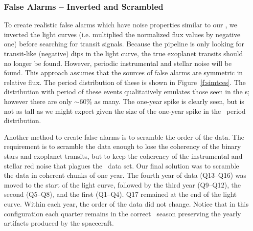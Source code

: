 \subsubsection{False Alarms -- Inverted and Scrambled} 

To create realistic false alarms which have noise properties similar to our , we inverted the light curves (i.e. multiplied the normalized flux values by negative one) before searching for transit signals. Because the pipeline is only looking for transit-like (negative) dips in the light curve, the true exoplanet transits should no longer be found. However, periodic instrumental and stellar noise will be found. This approach assumes that the sources of false alarms are symmetric in relative flux. The period distribution of these  is shown in Figure~\ref{f:simtces}. The distribution with period of these events qualitatively emulates those seen in the \opstce s; however there are only $\sim$60\% as many. The one-year spike is clearly seen, but is not as tall as we might expect given the size of the one-year spike in the \opstce\ period distribution. 

Another method to create false alarms is to scramble the order of the data. The requirement is to scramble the data enough to lose the coherency of the binary stars and exoplanet transits, but to keep the coherency of the instrumental and stellar red noise that plagues the \Kepler\ data set. Our final solution was to scramble the data in coherent chunks of one year. The fourth year of data (Q13--Q16) was moved to the start of the light curve, followed by the third year (Q9--Q12), the second (Q5--Q8), and the first (Q1--Q4). Q17 remained at the end of the light curve. Within each year, the order of the data did not change. Notice that in this configuration each quarter remains in the correct \Kepler\ season preserving the yearly artifacts produced by the spacecraft.


